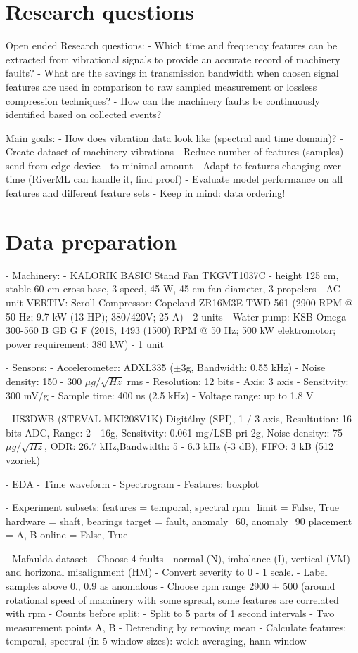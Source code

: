\section{Research questions}
Open ended Research questions:
	- Which time and frequency features can be extracted from vibrational signals to provide an accurate record of machinery faults?
	- What are the savings in transmission bandwidth when chosen signal features are used in comparison to raw sampled measurement or lossless compression techniques?
	- How can the machinery faults be continuously identified based on collected events?

Main goals:
	- How does vibration data look like (spectral and time domain)?
	- Create dataset of machinery vibrations
	- Reduce number of features (samples) send from edge device - to minimal amount
	- Adapt to features changing over time (RiverML can handle it, find proof)
	- Evaluate model performance on all features and different feature sets
	- Keep in mind: data ordering!

\section{Data preparation}
- Machinery:
   - KALORIK BASIC Stand Fan TKGVT1037C  - height 125 cm, stable 60 cm cross base, 3 speed, 45 W, 45 cm fan diameter, 3 propelers
   - AC unit VERTIV: Scroll Compressor: Copeland ZR16M3E-TWD-561 (2900 RPM @ 50 Hz; 9.7 kW (13 HP); 380/420V; 25 A) - 2 units
   - Water pump: KSB Omega 300-560 B GB G F (2018, 1493 (1500) RPM @ 50 Hz; 500 kW elektromotor; power requirement: 380 kW) - 1 unit
   
- Sensors:
	- Accelerometer: ADXL335 ($\pm$3g, Bandwidth: 0.55 kHz)
	- Noise density: 150 - 300 $\mu g / \sqrt{Hz}$ rms
	- Resolution: 12 bits
	- Axis: 3 axis
	- Sensitvity: 300 mV/g
	- Sample time: 400 ns (2.5 kHz)
	- Voltage range: up to 1.8 V
	
	- IIS3DWB (STEVAL-MKI208V1K) Digitálny (SPI), 1 / 3 axis, Resultution: 16 bits ADC, Range: 2 - 16g, Sensitvity: 0.061 mg/LSB pri 2g, Noise density:: 75 $\mu g / \sqrt{Hz}$, ODR: 26.7 kHz,Bandwidth: 5 - 6.3 kHz (-3 dB), FIFO: 3 kB (512 vzoriek)

- EDA
	- Time waveform
	- Spectrogram
	- Features: boxplot

- Experiment subsets:
	features = temporal, spectral
	rpm_limit = False, True
	hardware = shaft, bearings
	target = fault, anomaly_60, anomaly_90
	placement = A, B
	online = False, True


- Mafaulda dataset
	- Choose 4 faults - normal (N), imbalance (I), vertical (VM) and horizonal misalignment (HM)
	- Convert severity to 0 - 1 scale.
		- Label samples above 0., 0.9 as anomalous
	- Choose rpm range 2900 $\pm$ 500 (around rotational speed of machinery with some spread, some features are correlated with rpm 
	- Counts before split: 
		- Split to 5 parts of 1 second intervals
	- Two measurement points A, B
	- Detrending by removing mean
	- Calculate features: temporal, spectral (in 5 window sizes): welch averaging, hann window
	

